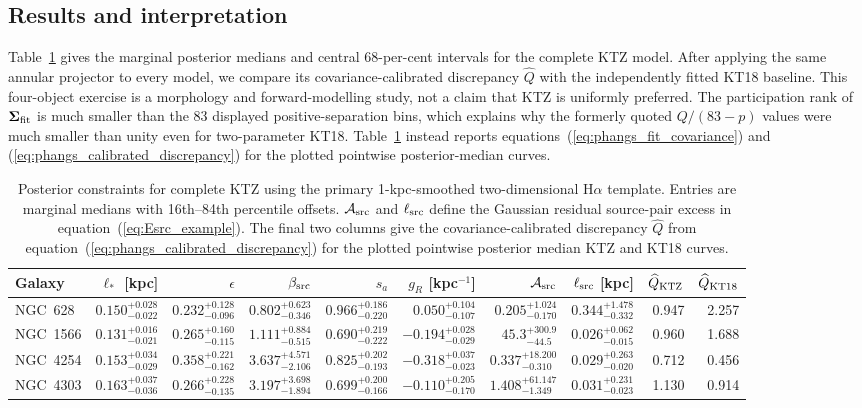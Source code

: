 \documentclass[fleqn,usenatbib]{mnras}
\begin{document}
\subsection{Results and interpretation}
\label{ssec:phangs_results}

Table~\ref{tab:phangs_posteriors} gives the marginal posterior medians and central 68-per-cent intervals for the complete KTZ model.  After applying the same annular projector to every model, we compare its covariance-calibrated discrepancy $\widehat Q$ with the independently fitted KT18 baseline.  This four-object exercise is a morphology and forward-modelling study, not a claim that KTZ is uniformly preferred.  The participation rank of $\boldsymbol\Sigma_{\rm fit}$ is much smaller than the 83 displayed positive-separation bins, which explains why the formerly quoted $Q/(83-p)$ values were much smaller than unity even for two-parameter KT18.  Table~\ref{tab:phangs_posteriors} instead reports equations~(\ref{eq:phangs_fit_covariance}) and (\ref{eq:phangs_calibrated_discrepancy}) for the plotted pointwise posterior-median curves.

\begin{table}
\centering
\footnotesize
\renewcommand{\arraystretch}{1.3}
\setlength{\tabcolsep}{3.2pt}
\caption{Posterior constraints for complete KTZ using the primary 1-kpc-smoothed two-dimensional H$\alpha$ template.  Entries are marginal medians with 16th--84th percentile offsets.  ${\cal A}_{\rm src}$ and $\ell_{\rm src}$ define the Gaussian residual source-pair excess in equation~(\ref{eq:Esrc_example}).  The final two columns give the covariance-calibrated discrepancy $\widehat Q$ from equation~(\ref{eq:phangs_calibrated_discrepancy}) for the plotted pointwise posterior median KTZ and KT18 curves.}
\label{tab:phangs_posteriors}
\begin{tabular}{@{}lrrrrrrrrr@{}}
\toprule
Galaxy & $\ell_\ast$ [kpc] & $\epsilon$ & $\beta_{\rm src}$ & $s_a$ & $g_R$ [kpc$^{-1}$] & ${\cal A}_{\rm src}$ & $\ell_{\rm src}$ [kpc] & $\widehat Q_{\rm KTZ}$ & $\widehat Q_{\rm KT18}$\\
\midrule
NGC~628
& $0.150_{-0.022}^{+0.028}$ & $0.232_{-0.096}^{+0.128}$ & $0.802_{-0.346}^{+0.623}$ & $0.966_{-0.220}^{+0.186}$ & $ 0.050_{-0.107}^{+0.104}$ & $0.205_{-0.170}^{+1.024}$ & $0.344_{-0.332}^{+1.478}$ & 0.947 & 2.257\\
NGC~1566
& $0.131_{-0.021}^{+0.016}$ & $0.265_{-0.115}^{+0.160}$ & $1.111_{-0.515}^{+0.884}$ & $0.690_{-0.222}^{+0.219}$ & $-0.194_{-0.029}^{+0.028}$ & $45.3_{-44.5}^{+300.9}$ & $0.026_{-0.015}^{+0.062}$ & 0.960 & 1.688\\
NGC~4254
& $0.153_{-0.029}^{+0.034}$ & $0.358_{-0.162}^{+0.221}$ & $3.637_{-2.106}^{+4.571}$ & $0.825_{-0.193}^{+0.202}$ & $-0.318_{-0.023}^{+0.037}$ & $0.337_{-0.310}^{+18.200}$ & $0.029_{-0.020}^{+0.263}$ & 0.712 & 0.456\\
NGC~4303
& $0.163_{-0.036}^{+0.037}$ & $0.266_{-0.135}^{+0.228}$ & $3.197_{-1.894}^{+3.698}$ & $0.699_{-0.166}^{+0.200}$ & $-0.110_{-0.170}^{+0.205}$ & $1.408_{-1.349}^{+61.147}$ & $0.031_{-0.023}^{+0.231}$ & 1.130 & 0.914\\
\bottomrule
\end{tabular}
\end{table}
\end{document}
